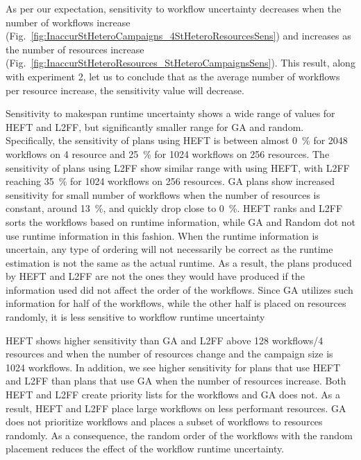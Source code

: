 As per our expectation, sensitivity to workflow uncertainty decreases when the 
number of workflows increase 
(Fig.~\ref{fig:InaccurStHeteroCampaigns_4StHeteroResourcesSens}) and increases 
as the number of resources increase 
(Fig.~\ref{fig:InaccurStHeteroResources_StHeteroCampaignsSens}). This result, 
along with experiment 2, let us to conclude that as the average number of 
workflows per resource increase, the sensitivity value will decrease.

Sensitivity to makespan runtime uncertainty shows a wide range of values for 
HEFT and L2FF, but significantly smaller range for GA and random. 
Specifically, the sensitivity of plans using HEFT is between almost 0~\% for 
2048 workflows on 4 resource and 25~\% for 1024 workflows on 256 resources. 
The sensitivity of plans using L2FF show similar range with using HEFT, with 
L2FF reaching 35~\% for 1024 workflows on 256 resources. GA plans show 
increased sensitivity for small number of workflows when the number of 
resources is constant, around 13~\%, and quickly drop close to 0~\%. HEFT 
ranks and L2FF sorts the workflows based on runtime information, while GA and 
Random dot not use runtime information in this fashion. When the runtime 
information is uncertain, any type of ordering will not necessarily be correct 
as the runtime estimation is not the same as the actual runtime. As a result, 
the plans produced by HEFT and L2FF are not the ones they would have produced 
if the information used did not affect the order of the workflows. Since GA 
utilizes such information for half of the workflows, while the other half is 
placed on resources randomly, it is less sensitive to workflow runtime 
uncertainty

HEFT shows higher sensitivity than GA and L2FF above 128 workflows/4 resources 
and when the number of resources change and the campaign size is 1024 
workflows. In addition, we see higher sensitivity for plans that use HEFT and 
L2FF than plans that use GA when the number of resources increase. Both HEFT 
and L2FF create priority lists for the workflows and GA does not. As a result, 
HEFT and L2FF place large workflows on less performant resources. GA does not 
prioritize workflows and places a subset of workflows to resources randomly. As 
a consequence, the random order of the workflows with the random placement 
reduces the effect of the workflow runtime uncertainty.

